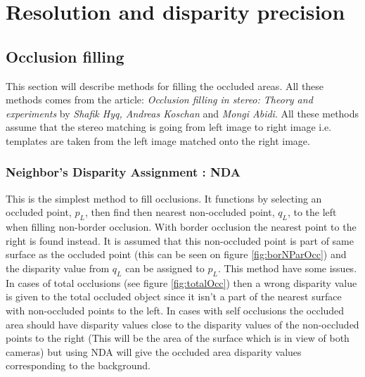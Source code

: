 \section{Resolution and disparity precision}

\subsection{Occlusion filling}
This section will describe methods for filling the occluded areas. All these methods comes from the article: \textit{Occlusion filling in stereo: Theory and experiments} by \textit{Shafik Hyq, Andreas Koschan} and \textit{Mongi Abidi}. All these methods assume that the stereo matching is going from left image to right image i.e. templates are taken from the left image matched onto the right image.
 
\subsubsection{Neighbor's Disparity Assignment : NDA}
This is the simplest method to fill occlusions. It functions by selecting an occluded point, $p_L$, then find then nearest non-occluded point, $q_L$, to the left when filling non-border occlusion. With border occlusion the nearest point to the right is found instead. It is assumed that this non-occluded point is part of same surface as the occluded point (this can be seen on figure \ref{fig:borNParOcc}) and the disparity value from $q_L$ can be assigned to $p_L$. This method have some issues. In cases of total occlusions (see figure \ref{fig:totalOcc}) then a wrong disparity value is given to the total occluded object since it isn't a part of the nearest surface with non-occluded points to the left. In cases with self occlusions the occluded area should have disparity values close to the disparity values of the non-occluded points to the right (This will be the area of the surface which is in view of both cameras) but using NDA will give the occluded area disparity values corresponding to the background. 

